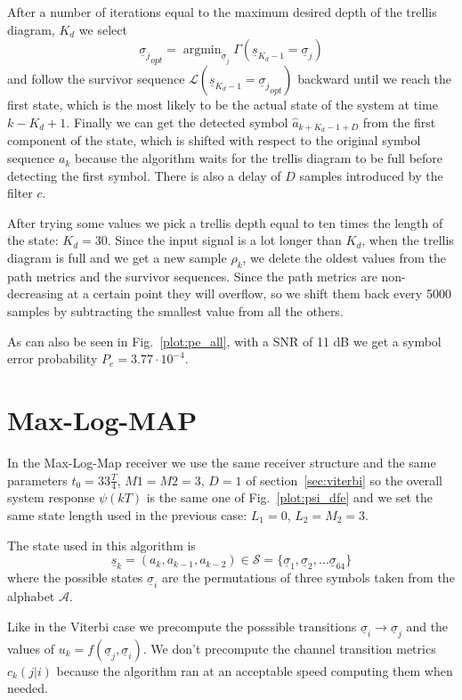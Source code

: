 \documentclass[a4paper,oneside]{article}
\renewcommand{\vec}[1]{\underline{#1}}
\DeclareMathOperator*{\argmin}{argmin}
\newcommand{\vsigma}[0]{\vec{\sigma}}
\begin{document}
After a number of iterations equal to the maximum desired depth of the
trellis diagram, $K_d$ we select
\begin{equation}
  {\vsigma_j}_{opt} = \argmin_{\vsigma_j} \Gamma(\vec{s}_{K_d-1} = \vec{\sigma}_j)
\end{equation}
and follow the survivor sequence $\mathcal{L}(\vec{s}_{K_d-1} =
{\vsigma_j}_{opt})$ backward until we reach the first state,
{\color{red}which is the most likely to be the actual state of the
  system at time $k-K_d+1$. Finally we can get the detected symbol
  $\hat{a}_{k+K_d-1+D}$ from the first component of the state}, which
is shifted with respect to the original symbol sequence $a_k$ because
the algorithm waits for the trellis diagram to be full before
detecting the first symbol. {\color{red}There is also a delay of $D$
  samples introduced by the filter $c$}.

After trying some values we pick a trellis depth equal to ten times
the length of the state: $K_d = 30$. Since the input signal is a lot
longer than $K_d$, when the trellis diagram is full and we get a new
sample $\rho_k$, we delete the oldest values from the path metrics and
the survivor sequences. Since the path metrics are non-decreasing at a
certain point they will overflow, so we shift them back every 5000
samples by subtracting the smallest value from all the others.

As can also be seen in Fig.~\ref{plot:pe_all}, with a SNR of 11 dB we
get a symbol error probability $P_e = 3.77 \cdot 10^{-4}$.
\section{Max-Log-MAP}
In the Max-Log-Map receiver we use the same receiver structure and the
same parameters $t_0 = 33\frac{T}{4}$, $M1 = M2 = 3$, $D=1$ of
section~\ref{sec:viterbi} so the overall system response $\psi(kT)$ is
the same one of Fig.~\ref{plot:psi_dfe} and we set the same state
length used in the previous case: $L_1 = 0$, $L_2 = M_2 = 3$.

The state used in this algorithm is
\begin{equation}
  \vec{s}_k = (a_k,a_{k-1}, a_{k-2}) \in \mathcal{S} = \{ \vec{\sigma}_1, \vec{\sigma}_2, \dots \vec{\sigma}_{64} \}
\end{equation}
where the possible states $\vsigma_i$ are the permutations of three
symbols taken from the alphabet $\mathcal{A}$.

Like in the Viterbi case we precompute the posssible transitions
$\vsigma_i \rightarrow \vsigma_j$ and the values of $u_k =
f(\vsigma_j, \vsigma_i)$. We don't precompute the channel transition
metrics $c_k(j | i)$ because the algorithm ran at an acceptable speed
computing them when needed.
\end{document}
